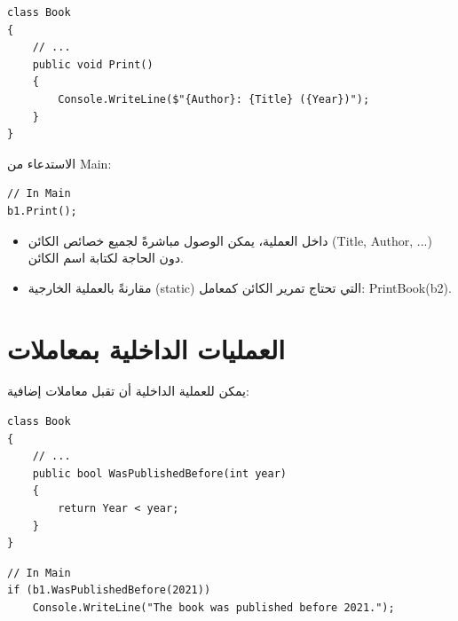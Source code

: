 \documentclass[14pt]{extarticle}
\begin{document}
\begin{boxExample}
\begin{english}
\begin{verbatim}
class Book
{
    // ...
    public void Print()
    {
        Console.WriteLine($"{Author}: {Title} ({Year})");
    }
}
\end{verbatim}
\end{english}
\end{boxExample}

الاستدعاء من \textenglish{Main}:

\begin{boxExample}
\begin{english}
\begin{verbatim}
// In Main
b1.Print();
\end{verbatim}
\end{english}
\end{boxExample}

\begin{itemize}[itemsep=1pt]
    \item داخل العملية، يمكن الوصول مباشرةً لجميع خصائص الكائن (\textenglish{Title, Author, ...}) دون الحاجة لكتابة اسم الكائن.
    \item مقارنةً بالعملية الخارجية (\textenglish{static}) التي تحتاج تمرير الكائن كمعامل: \textenglish{PrintBook(b2)}.
\end{itemize}

\clearpage
\section{العمليات الداخلية بمعاملات}

يمكن للعملية الداخلية أن تقبل معاملات إضافية:

\begin{boxExample}
\begin{english}
\begin{verbatim}
class Book
{
    // ...
    public bool WasPublishedBefore(int year)
    {
        return Year < year;
    }
}
\end{verbatim}
\end{english}
\end{boxExample}

\begin{boxExample}
\begin{english}
\begin{verbatim}
// In Main
if (b1.WasPublishedBefore(2021))
    Console.WriteLine("The book was published before 2021.");
\end{verbatim}
\end{english}
\end{boxExample}
\end{document}
